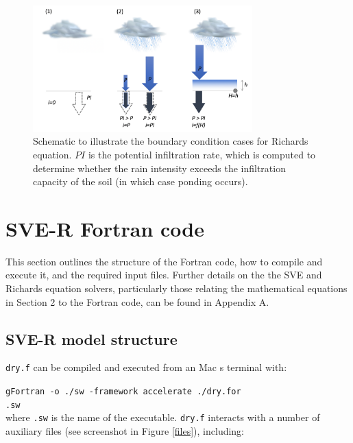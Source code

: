\documentclass{article}
\newcommand{\code}[1]{\texttt{#1}}
\begin{document}
 	
 \begin{figure}[h]
 \centering
\includegraphics[width=20pc]{grid/richards.png}
 \caption{Schematic to illustrate the boundary condition cases for Richards equation. $PI$ is the potential infiltration rate, which is computed to determine whether the rain intensity exceeds the infiltration capacity of the soil (in which case ponding occurs).}
 \label{richardgrid}
 \end{figure}	


\newpage

\section{SVE-R Fortran code}

This section outlines the structure of the Fortran code, how to compile and execute it, and the required input files.  Further details on the the SVE and Richards equation solvers, particularly those relating the mathematical equations in Section 2 to the Fortran code, can be found in Appendix A.

\label{SVE_solver}


\subsection{SVE-R model structure}

\code{dry.f} can be compiled and executed from an Mac s terminal with:

\hspace*{8mm} \code{gFortran -o ./sw  -framework accelerate ./dry.for} \\
\hspace*{8mm} \code{.sw} \\

 where \code{.sw} is the name of the executable.  \code{dry.f} interacts with a number of auxiliary files (see screenshot in Figure \ref{files}), including:
\end{document}
